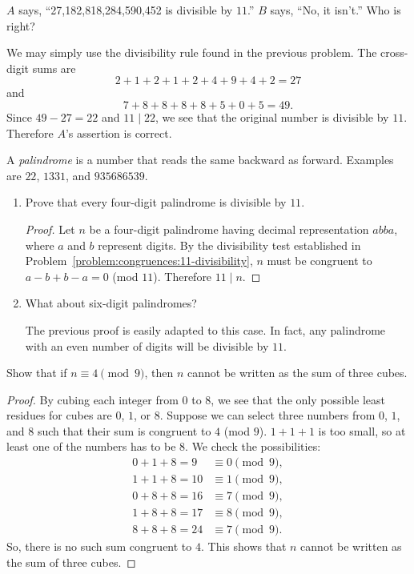  $A$ says, ``27,182,818,284,590,452 is divisible by
$11$.'' $B$ says, ``No, it isn't.'' Who is right?
\begin{solution}
  We may simply use the divisibility rule found in the previous
  problem. The cross-digit sums are
  \begin{equation*}
    2 + 1 + 2 + 1 + 2 + 4 + 9 + 4 + 2 = 27
  \end{equation*}
  and
  \begin{equation*}
    7 + 8 + 8 + 8 + 8 + 5 + 0 + 5 = 49.
  \end{equation*}
  Since $49 - 27 = 22$ and $11\mid22$, we see that the original number
  is divisible by $11$. Therefore $A$'s assertion is correct.
\end{solution}

 A {\em palindrome} is a number that reads the same
backward as forward. Examples are $22$, $1331$, and $935686539$.
\begin{enumerate}
\item Prove that every four-digit palindrome is divisible by $11$.
  \begin{proof}
    Let $n$ be a four-digit palindrome having decimal representation
    $abba$, where $a$ and $b$ represent digits. By the divisibility
    test established in
    Problem~\ref{problem:congruences:11-divisibility}, $n$ must be
    congruent to $a - b + b - a = 0$ (mod $11$). Therefore $11\mid n$.
  \end{proof}
\item What about six-digit palindromes?
  \begin{solution}
    The previous proof is easily adapted to this case. In fact, any
    palindrome with an even number of digits will be divisible by
    $11$.
  \end{solution}
\end{enumerate}

 Show that if $n\equiv4\pmod9$, then $n$ cannot be written
as the sum of three cubes.
\begin{proof}
  By cubing each integer from $0$ to $8$, we see that the only
  possible least residues for cubes are $0$, $1$, or $8$. Suppose we
  can select three numbers from $0$, $1$, and $8$ such that their sum
  is congruent to $4$ (mod $9$). $1 + 1 + 1$ is too small, so at least
  one of the numbers has to be $8$. We check the possibilities:
  \begin{align*}
    0 + 1 + 8 = 9 &\equiv 0 \pmod 9, \\
    1 + 1 + 8 = 10 &\equiv 1 \pmod 9, \\
    0 + 8 + 8 = 16 &\equiv 7 \pmod 9, \\
    1 + 8 + 8 = 17 &\equiv 8 \pmod 9, \\
    8 + 8 + 8 = 24 &\equiv 7 \pmod 9.
  \end{align*}
  So, there is no such sum congruent to $4$. This shows that $n$
  cannot be written as the sum of three cubes.
\end{proof}

